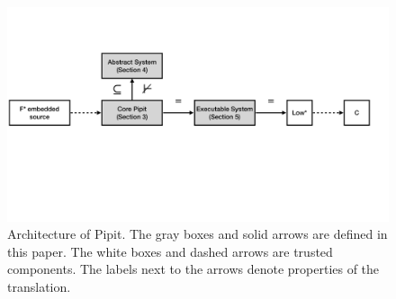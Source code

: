 \begin{figure}
  \includegraphics[width=\textwidth]{figures/core-structure.pdf}
\caption{Architecture of Pipit. The gray boxes and solid arrows are defined in this paper. The white boxes and dashed arrows are trusted components. The labels next to the arrows denote properties of the translation.
}
\label{f:core:structure}
\end{figure}
